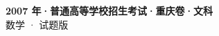 \documentclass[zihao=-4, a4paper]{ctexart}
\begin{document}
\begin{center}
  {\Large\bfseries 2007 年·普通高等学校招生考试·重庆卷·文科}\\[4pt]
  {\large 数学 · 试题版}
\end{center}
\medskip
{}

\end{document}
